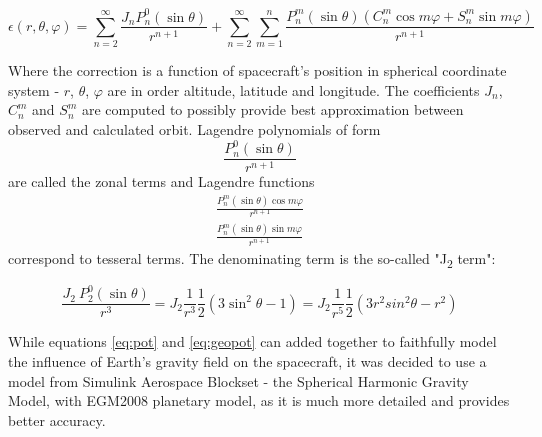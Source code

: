         \begin{equation}
            \epsilon(r, \theta, \varphi) = \sum_{n=2}^{\infty}  \frac{J_n P^0_n(\sin\theta) }{r^{n+1}} + \sum_{n=2}^{\infty} \sum_{m=1}^n \frac{ P^m_n(\sin\theta) (C_n^m \cos m\varphi + S_n^m \sin m\varphi)}{r^{n+1}}\label{eq:geopot}
        \end{equation}

        Where the correction is a function of spacecraft's position in spherical coordinate system - $r$, $\theta$, $\varphi$ are in order altitude, latitude and longitude. The coefficients $J_n$, $C_n^m$ and $S_n^m$ are computed to possibly provide best approximation between observed and calculated orbit. Lagendre polynomials of form 
        \begin{equation}
            \frac{P^0_n(\sin\theta) }{r^{n+1}}    
        \end{equation}
        are called the zonal terms and Lagendre functions 
        \begin{equation}
        \begin{aligned}
            \frac{ P^m_n(\sin\theta) \cos m\varphi}{r^{n+1}}\\
            \frac{ P^m_n(\sin\theta) \sin m\varphi}{r^{n+1}}
        \end{aligned}
        \end{equation}
        correspond to tesseral terms. The denominating term is the so-called "J\textsubscript{2} term":

        \begin{equation}
            \frac{J_2\ P^0_2(\sin\theta)}{r^3} = J_2 \frac{1}{r^3} \frac{1}{2} (3\sin^2\theta -1) = J_2 \frac{1}{r^5} \frac{1}{2} (3 r^2sin^2\theta -r^2)
        \end{equation}

        While equations \eqref{eq:pot} and \eqref{eq:geopot} can added together to faithfully model the influence of Earth's gravity field on the spacecraft, it was decided to use a model from Simulink Aerospace Blockset - the Spherical Harmonic Gravity Model, with EGM2008 planetary model, as it is much more detailed and provides better accuracy.



